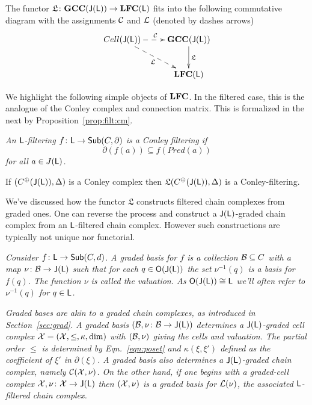 \begin{prop}\label{prop:filt:functor2}
The functor $\mathfrak{L}\colon {\bf GCC}({\mathsf J}({\mathsf L}))\to {\bf LFC}({\mathsf L})$ fits into the following commutative diagram with the assignments ${\mathcal C}$ and ${\mathcal L}$ (denoted by dashes arrows)
\[
\xymatrixrowsep{0.35in}
\xymatrixcolsep{0.35in}
\xymatrix{
Cell(\sJ(\sL)) \ar@{-->}[dr]_{\cL} \ar@{-->}[r]^{\cC} & \bGCC(\sJ(\sL)) \ar[d]^{\mathfrak{L}} \\
 & {\bf LFC(\sL)}
}
\]
\end{prop}

We highlight the following simple objects of ${\bf LFC}$. In the filtered case, this is the analogue of the Conley complex and connection matrix.  This is formalized in the next by Proposition~\ref{prop:filt:cm}.



\begin{defn}
{\em 
An ${\mathsf L}$-filtering $f\colon {\mathsf L} \to \mathsf{Sub}(C,\partial)$ is a \em{Conley filtering} if
\[
\partial(f(a)) \subseteq f(Pred(a))
\]
for all $a\in J({\mathsf L})$.
}
\end{defn}



\begin{prop}\label{prop:filt:cm}
If $(C^\oplus({\mathsf J}({\mathsf L})),\Delta)$ is a Conley complex then $\mathfrak{L}(C^\oplus({\mathsf J}({\mathsf L})),\Delta)$ is a Conley-filtering.
\end{prop}



We've discussed how the functor $\mathfrak{L}$ constructs filtered chain complexes from graded ones.  One can reverse the process and construct a ${\mathsf J}({\mathsf L})$-graded chain complex from an ${\mathsf L}$-filtered chain complex.  However such constructions are typically not unique nor functorial.


\begin{defn}
{\em
Consider $f\colon {\mathsf L}\to \mathsf{Sub}(C,d)$.  A {\em graded basis for $f$} is a collection ${\mathcal B}\subseteq C$ with a map $\nu\colon {\mathcal B}\to {\mathsf J}({\mathsf L})$ such that for each $q\in {\mathsf O}({\mathsf J}({\mathsf L}))$ the set $\nu^{-1}(q)$ is a basis for $f(q)$.
 The function $\nu$ is called the {\em valuation}. As ${\mathsf O}({\mathsf J}({\mathsf L})) \cong {\mathsf L}$ we'll often refer to $\nu^{-1}(q)$ for $q\in {\mathsf L}$.  
}
\end{defn}

\begin{rem}\label{rem:filt:basis}
{\em
Graded bases are akin to a graded chain complexes, as introduced in Section~\ref{sec:grad}. A graded basis $({\mathcal B},\nu\colon {\mathcal B}\to {\mathsf J}({\mathsf L}))$ determines a ${\mathsf J}({\mathsf L})$-graded cell complex ${\mathcal X}=({\mathcal X},\leq,\kappa,\dim)$ with $({\mathcal B},\nu)$ giving the cells and valuation. The partial order $\leq$ is determined by Eqn.~\ref{eqn:poset} and $\kappa(\xi,\xi')$ defined as the coefficient of $\xi'$ in $\partial(\xi)$.  A graded basis also determines a ${\mathsf J}({\mathsf L})$-graded chain complex, namely ${\mathcal C}({\mathcal X},\nu)$.    On the other hand, if one begins with a graded-cell complex ${\mathcal X},\nu\colon {\mathcal X}\to {\mathsf J}({\mathsf L})$ then $({\mathcal X},\nu)$ is a graded basis for ${\mathcal L}(\nu)$, the associated ${\mathsf L}$-filtered chain complex.   
}
\end{rem}

